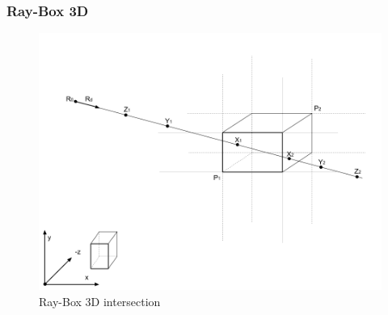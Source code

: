 \subsubsection{Ray-Box 3D}

\begin{figure}[H]
\caption{Ray-Box 3D intersection}
\label{fig:ray-box-3d}
\centering
\includegraphics[width=\linewidth]{Figures/ray-box-3d-intersection.png}
\decoRule
\end{figure}

